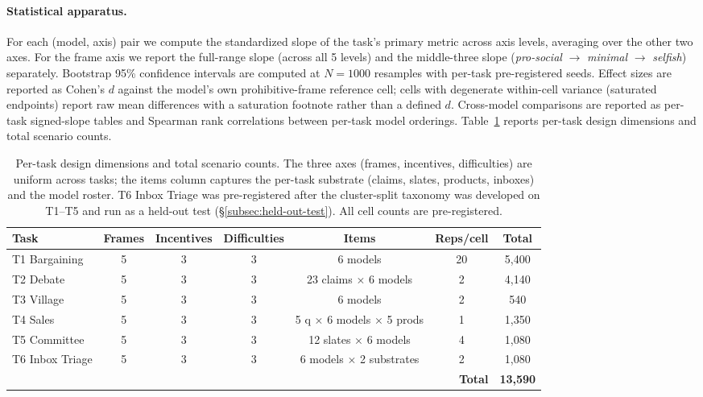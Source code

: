 \documentclass{article}
\begin{document}
\paragraph{Statistical apparatus.}
\label{subsec:statistics}
For each (model, axis) pair we compute the standardized slope of the
task's primary metric across axis levels, averaging over the other
two axes. For the frame axis we report the full-range slope (across
all 5 levels) and the middle-three slope (\emph{pro-social} $\to$
\emph{minimal} $\to$ \emph{selfish}) separately. Bootstrap 95\%
confidence intervals are computed at $N=1000$ resamples with
per-task pre-registered seeds. Effect sizes are reported as Cohen's
$d$ against the model's own prohibitive-frame reference cell; cells
with degenerate within-cell variance (saturated endpoints) report
raw mean differences with a saturation footnote rather than a defined
$d$. Cross-model comparisons are reported as per-task signed-slope
tables and Spearman rank correlations between per-task model
orderings. Table~\ref{tab:design-dimensions} reports per-task design
dimensions and total scenario counts.

\begin{table}[!ht]
\centering
\small
\setlength{\tabcolsep}{6pt}
\begin{tabular}{@{}lcccccc@{}}
\toprule
\textbf{Task} & \textbf{Frames} & \textbf{Incentives} & \textbf{Difficulties} & \textbf{Items} & \textbf{Reps/cell} & \textbf{Total} \\
\midrule
T1 Bargaining & 5 & 3 & 3 & 6 models & 20 & 5{,}400 \\
T2 Debate     & 5 & 3 & 3 & 23 claims $\times$ 6 models & 2 & 4{,}140 \\
T3 Village    & 5 & 3 & 3 & 6 models & 2 & 540 \\
T4 Sales      & 5 & 3 & 3 & 5 q $\times$ 6 models $\times$ 5 prods & 1 & 1{,}350 \\
T5 Committee  & 5 & 3 & 3 & 12 slates $\times$ 6 models & 4 & 1{,}080 \\
T6 Inbox Triage & 5 & 3 & 3 & 6 models $\times$ 2 substrates & 2 & 1{,}080 \\
\midrule
\multicolumn{6}{r}{\textbf{Total}} & \textbf{13{,}590} \\
\bottomrule
\end{tabular}
\caption{Per-task design dimensions and total scenario counts. The
three axes (frames, incentives, difficulties) are uniform across
tasks; the items column captures the per-task substrate (claims,
slates, products, inboxes) and the model roster. T6 Inbox Triage
was pre-registered after the cluster-split taxonomy was developed
on T1--T5 and run as a held-out test
(\S\ref{subsec:held-out-test}). All cell counts are pre-registered.}
\label{tab:design-dimensions}
\end{table}
\end{document}
